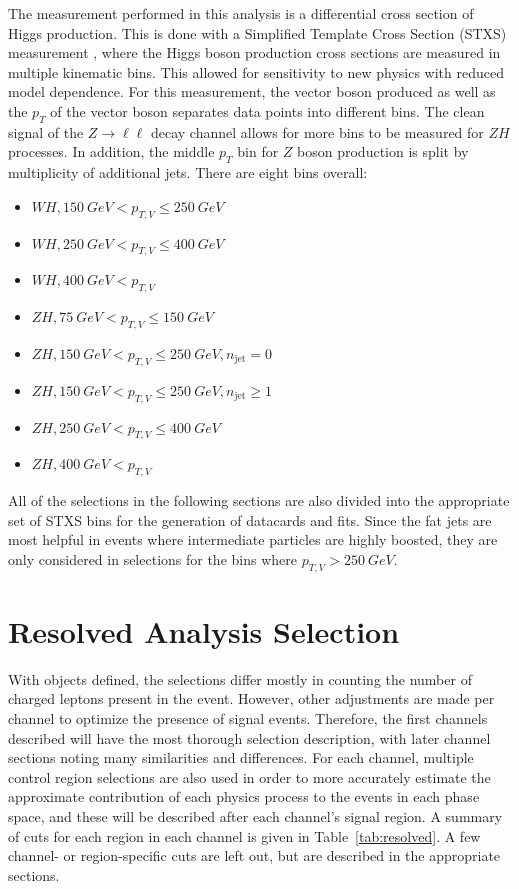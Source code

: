 The measurement performed in this analysis is a differential cross section of Higgs production.
This is done with a Simplified Template Cross Section (STXS) measurement \cite{Kato:2687920},
where the Higgs boson production cross sections are measured in multiple kinematic bins.
This allowed for sensitivity to new physics with reduced model dependence.
For this measurement, the vector boson produced as well as the $p_T$ of the vector boson
separates data points into different bins.
The clean signal of the $Z\rightarrow\ell\ell$ decay channel allows for more
bins to be measured for $ZH$ processes.
In addition, the middle $p_T$ bin for $Z$ boson production is split by multiplicity
of additional jets.
There are eight bins overall:
\begin{itemize}
\item $WH, \SI{150}{GeV} < p_{T,V} \le \SI{250}{GeV}$
\item $WH, \SI{250}{GeV} < p_{T,V} \le \SI{400}{GeV}$
\item $WH, \SI{400}{GeV} < p_{T,V}$
\item $ZH, \SI{75}{GeV} < p_{T,V} \le \SI{150}{GeV}$
\item $ZH, \SI{150}{GeV} < p_{T,V} \le \SI{250}{GeV}, n_\mathrm{jet} = 0$
\item $ZH, \SI{150}{GeV} < p_{T,V} \le \SI{250}{GeV}, n_\mathrm{jet} \ge 1$
\item $ZH, \SI{250}{GeV} < p_{T,V} \le \SI{400}{GeV}$
\item $ZH, \SI{400}{GeV} < p_{T,V}$
\end{itemize}
All of the selections in the following sections are also divided into the appropriate
set of STXS bins for the generation of datacards and fits.
Since the fat jets are most helpful in events where intermediate particles are highly boosted,
they are only considered in selections for the bins where $p_{T,V} > \SI{250}{GeV}$.

\section{Resolved Analysis Selection}

With objects defined, the selections differ mostly in counting the number
of charged leptons present in the event.
However, other adjustments are made per channel to optimize the presence of signal events.
Therefore, the first channels described will have the most thorough selection description,
with later channel sections noting many similarities and differences.
For each channel, multiple control region selections are also used in order to more accurately
estimate the approximate contribution of each physics process to the events in each phase space,
and these will be described after each channel's signal region.
A summary of cuts for each region in each channel
is given in Table~\ref{tab:resolved}.
A few channel- or region-specific cuts are left out,
but are described in the appropriate sections.

